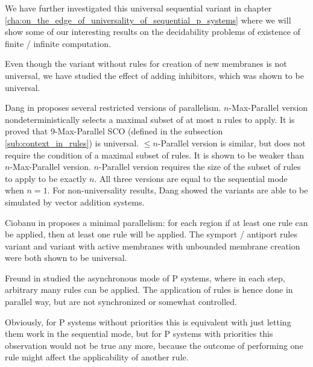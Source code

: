 We have further investigated this universal sequential variant in chapter \ref{cha:on_the_edge_of_universality_of_sequential_p_systems} where we will show some of our interesting results on the decidability problems of existence of finite / infinite computation.

Even though the variant without rules for creation of new membranes is not universal, we have studied the effect of adding inhibitors, which was shown to be universal.


Dang in \cite{Ibarra04dang} proposes several restricted versions of parallelism.
$n$-Max-Parallel version nondeterministically selects a maximal subset of at most n rules to apply. It is proved that 9-Max-Parallel SCO (defined in the subsection \ref{sub:context_in_rules}) is universal.
$\leq n$-Parallel version is similar, but does not require the condition of a maximal subset of rules. It is shown to be weaker than $n$-Max-Parallel version.
$n$-Parallel version requires the size of the subset of rules to apply to be exactly $n$.
All three versions are equal to the sequential mode when $n=1$. For non-universality results, Dang showed the variants are able to be simulated by vector addition systems.


Ciobanu in \cite{Ciobanu:2007:MinimalParallelism} proposes a minimal parallelism: for each region if at least one rule can be applied, then at least one rule will be applied. The symport / antiport rules variant and variant with active membranes with unbounded membrane creation were both shown to be universal.


Freund in \cite{Freund:2004:Async} studied the asynchronous mode of P systems, where in each step, arbitrary many rules can be applied. The application of rules is hence done in parallel way, but are not synchronized or somewhat controlled.

Obviously, for P systems without priorities this is equivalent with just letting them work in the sequential mode, but for P systems with priorities this observation would not be true any more, because the outcome of performing one rule might affect the applicability of another rule.


